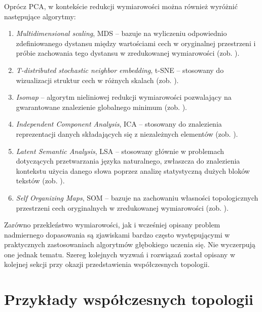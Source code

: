 Oprócz PCA, w kontekście redukcji wymiarowości można również wyróżnić następujące algorytmy: 
\begin{enumerate}
	\item \textit{Multidimensional scaling}, MDS -- bazuje na wyliczeniu odpowiednio zdefiniowanego dystansu między wartościami cech w oryginalnej przestrzeni i próbie zachowania tego dystansu w zredukowanej wymiarowości (zob. \cite{Chen:2008:HDV:1370965}).
	\item \textit{T-distributed stochastic neighbor embedding}, t-SNE -- stosowany do wizualizacji struktur cech w różnych skalach (zob. \cite{vanDerMaaten2008}).
	\item \textit{Isomap} -- algorytm nieliniowej redukcji wymiarowości pozwalający na gwarantowane znalezienie globalnego minimum (zob. \cite{tenenbaum_global_2000}). 
	\item \textit{Independent Component Analysis}, ICA -- stosowany do znalezienia reprezentacji danych składających się z niezależnych elementów (zob. \cite{ICA}).
	\item \textit{Latent Semantic Analysis}, LSA -- stosowany głównie w problemach dotyczących przetwarzania języka naturalnego, zwłaszcza do znalezienia kontekstu użycia danego słowa poprzez analizę statystyczną dużych bloków tekstów (zob. \cite{Wolfe2003}). 
	\item \textit{Self Organizing Maps}, SOM --  bazuje na zachowaniu własności topologicznych przestrzeni cech oryginalnych w zredukowanej wymiarowości (zob. \cite{Vesanto00self-organizingmap}).
\end{enumerate}

Zarówno przekleństwo wymiarowości, jak i wcześniej opisany problem nadmiernego dopasowania są zjawiskami bardzo często występującymi w praktycznych zastosowaniach algorytmów głębokiego uczenia się. Nie wyczerpują one jednak tematu. Szereg kolejnych wyzwań i rozwiązań został opisany w kolejnej sekcji przy okazji przedstawienia współczesnych topologii.

\section{Przykłady współczesnych topologii}

